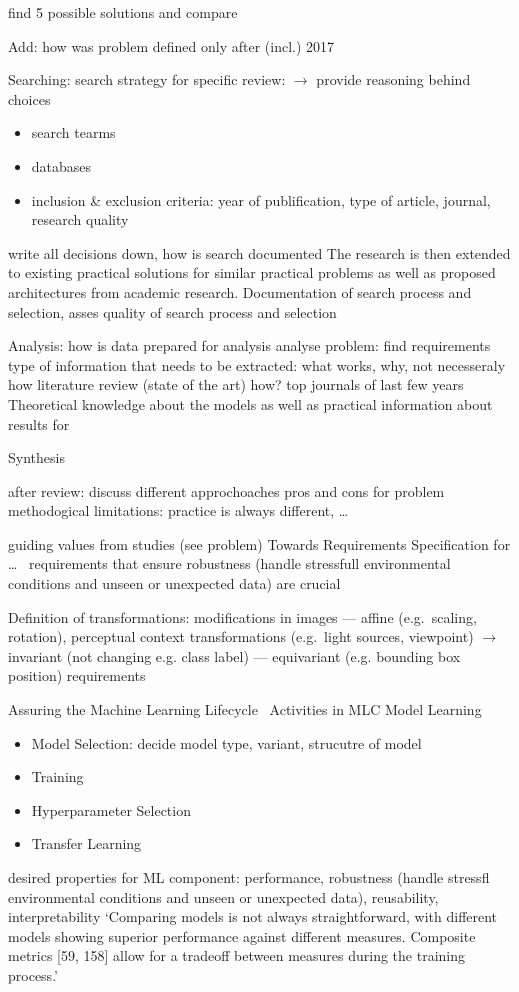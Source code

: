 

find 5 possible solutions and compare

Add: how was problem defined
only after (incl.) 2017

Searching:
search strategy for specific review: $\rightarrow$ provide reasoning behind choices
\begin{itemize}
    \item search tearms
    \item databases
    \item inclusion \& exclusion criteria: year of publification, type of article, journal, research
        quality
\end{itemize}
write all decisions down, how is search documented
The research is then extended to existing practical solutions for similar practical problems as
well as proposed architectures from academic research.
Documentation of search process and selection, asses quality of search process and selection

Analysis:
how is data prepared for analysis
analyse problem: find requirements
type of information that needs to be extracted: what works, why, not necesseraly how
literature review (state of the art)
how? top journals of last few years
Theoretical knowledge about the models as well as practical information about results for

Synthesis

after review:
discuss different approchoaches pros and cons for problem
methodogical limitations: practice is always different, \ldots


guiding values from studies (see problem)
Towards Requirements Specification for \ldots~\cite{hu_towards_2020}
requirements that ensure robustness (handle stressfull environmental conditions and unseen or
unexpected data) are crucial

Definition of transformations: modifications in images
--- affine (e.g.\ scaling, rotation), perceptual context transformations (e.g.\ light sources, viewpoint)
$\rightarrow$ invariant (not changing e.g. class label) --- equivariant (e.g. bounding
                box position) requirements


Assuring the Machine Learning Lifecycle~\cite{ashmore_assuring_2021}
Activities in MLC Model Learning
\begin{itemize}
    \item Model Selection: decide model type, variant, strucutre of model
    \item Training
    \item Hyperparameter Selection
    \item Transfer Learning
\end{itemize}
desired properties for ML component: performance, robustness (handle stressfl environmental
conditions and unseen or unexpected data), reusability, interpretability
`Comparing models is not always straightforward, with different models showing superior performance
against different measures. Composite metrics [59, 158] allow for a tradeoff between measures
during the training process.'

